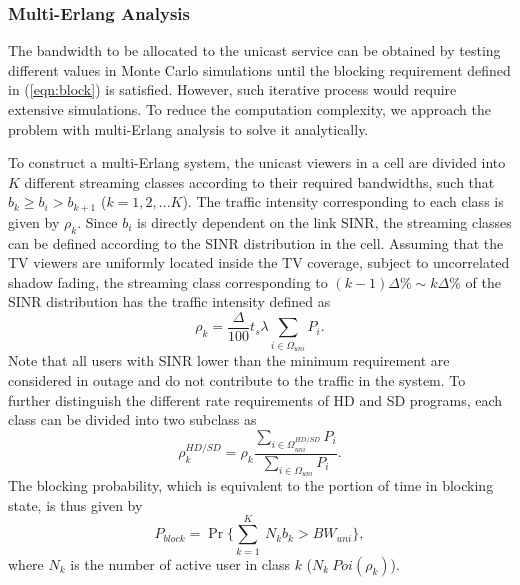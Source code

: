 \documentclass[journal]{IEEEtran}
\begin{document}
\subsubsection{\textbf{Multi-Erlang Analysis}}
The bandwidth to be allocated to the unicast service can be obtained by testing different values in Monte Carlo simulations until the blocking requirement defined in (\ref{eqn:block}) is satisfied. However, such iterative process would require extensive simulations. To reduce the computation complexity, we approach the problem with multi-Erlang analysis to solve it analytically.

To construct a multi-Erlang system, the unicast viewers in a cell are divided into $K$ different streaming classes according to their required bandwidths, such that $b_k\geq b_i>b_{k+1}$ ($k=1,2,...K$). The traffic intensity corresponding to each class is given by $\rho_k$. Since $b_i$ is directly dependent on the link SINR, the streaming classes can be defined according to the SINR distribution in the cell. Assuming that the TV viewers are uniformly located inside the TV coverage, subject to uncorrelated shadow fading, the streaming class corresponding to $(k-1)\Delta\%\sim k\Delta\%$ of the SINR distribution has the traffic intensity defined as
\begin{equation}\label{rho}
   \rho_k=\frac{\Delta}{100}t_s\lambda\sum_{i\in\Omega_{uni}}P_i.
\end{equation}
Note that all users with SINR lower than the minimum requirement are considered in outage and do not contribute to the traffic in the system.
To further distinguish the different rate requirements of HD and SD programs, each class can be divided into two subclass as
\begin{equation}\label{hd/sd}
  \rho_k^{HD/SD}=\rho_k\frac{\sum_{i\in\Omega_{uni}^{HD/SD}}P_i}{\sum_{i\in\Omega_{uni}}P_i}.
\end{equation}
The blocking probability, which is equivalent to the portion of time in blocking state, is thus given by
\begin{equation}\label{eqn:block2}
  P_{block}=\Pr\{\sum_{k=1}^K\ N_k b_k>BW_{uni}\},
\end{equation}
where $N_k$ is the number of active user in class $k$ ($N_k~Poi(\rho_k)$).
\end{document}
